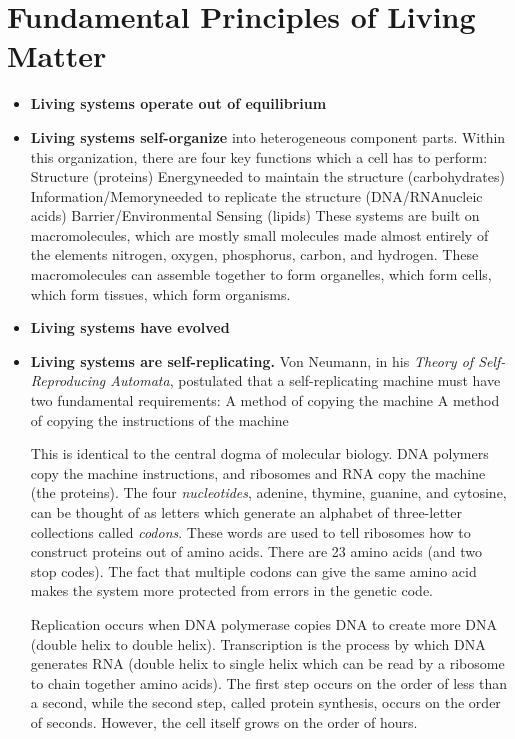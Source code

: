 \documentclass[a4paper,twoside,master.tex]{subfiles}
\begin{document}
\section{Fundamental Principles of Living Matter}\label{sec:fundamental_principles_of_living_matter}

\begin{itemize}
    \item \textbf{Living systems operate out of equilibrium}
    \item \textbf{Living systems self-organize} into heterogeneous component parts. Within this organization, there are four key functions which a cell has to perform:
        \subitem Structure (proteins)
        \subitem Energy\textemdash needed to maintain the structure (carbohydrates)
        \subitem Information/Memory\textemdash needed to replicate the structure (DNA/RNA\textemdash nucleic acids)
        \subitem Barrier/Environmental Sensing (lipids)
    These systems are built on macromolecules, which are mostly small molecules made almost entirely of the elements nitrogen, oxygen, phosphorus, carbon, and hydrogen. These macromolecules can assemble together to form organelles, which form cells, which form tissues, which form organisms.
    \item \textbf{Living systems have evolved}
    \item \textbf{Living systems are self-replicating.} Von Neumann, in his \textit{Theory of Self-Reproducing Automata}, postulated that a self-replicating machine must have two fundamental requirements:
        \subitem A method of copying the machine
        \subitem A method of copying the instructions of the machine

        This is identical to the central dogma of molecular biology. DNA polymers copy the machine instructions, and ribosomes and RNA copy the machine (the proteins). The four \textit{nucleotides}, adenine, thymine, guanine, and cytosine, can be thought of as letters which generate an alphabet of three-letter collections called \textit{codons}. These words are used to tell ribosomes how to construct proteins out of amino acids. There are 23 amino acids (and two stop codes). The fact that multiple codons can give the same amino acid makes the system more protected from errors in the genetic code.
    
        Replication occurs when DNA polymerase copies DNA to create more DNA (double helix to double helix). Transcription is the process by which DNA generates RNA (double helix to single helix which can be read by a ribosome to chain together amino acids). The first step occurs on the order of less than a second, while the second step, called protein synthesis, occurs on the order of seconds. However, the cell itself grows on the order of hours.


\end{itemize}
\end{document}
